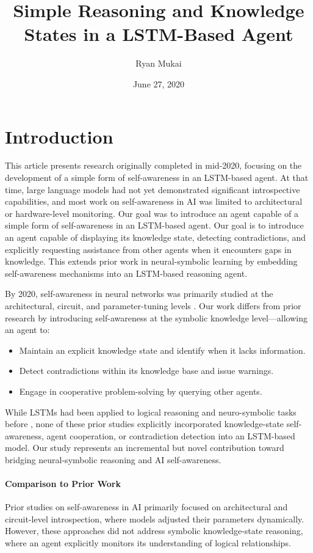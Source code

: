\documentclass{article}
\title{Simple Reasoning and Knowledge States in a LSTM-Based Agent}
\author{Ryan Mukai}
\date{June 27, 2020}
\begin{document}
\maketitle

\section{Introduction}

This article presents research originally completed in mid-2020, focusing on the development of a simple form of self-awareness in an LSTM-based agent. At that time, large language models had not yet demonstrated significant introspective capabilities, and most work on self-awareness in AI was limited to architectural or hardware-level monitoring. Our goal was to introduce an agent capable of a simple form of self-awareness in an LSTM-based agent. Our goal is to introduce an agent capable of displaying its knowledge state, detecting contradictions, and explicitly requesting assistance from other agents when it encounters gaps in knowledge. This extends prior work in neural-symbolic learning by embedding self-awareness mechanisms into an LSTM-based reasoning agent.

By 2020, self-awareness in neural networks was primarily studied at the architectural, circuit, and parameter-tuning levels \cite{9045930}. Our work differs from prior research by introducing self-awareness at the symbolic knowledge level—allowing an agent to:
\begin{itemize}
    \item Maintain an explicit knowledge state and identify when it lacks information.
    \item Detect contradictions within its knowledge base and issue warnings.
    \item Engage in cooperative problem-solving by querying other agents.
\end{itemize}

While LSTMs had been applied to logical reasoning and neuro-symbolic tasks before \cite{DBLP:journals/corr/abs-1711-03902, neural_symbolic_2007, DBLP:journals/corr/abs-1802-08535}, none of these prior studies explicitly incorporated knowledge-state self-awareness, agent cooperation, or contradiction detection into an LSTM-based model. Our study represents an incremental but novel contribution toward bridging neural-symbolic reasoning and AI self-awareness.

\paragraph{Comparison to Prior Work}
Prior studies on self-awareness in AI \cite{9045930} primarily focused on architectural and circuit-level introspection, where models adjusted their parameters dynamically. However, these approaches did not address symbolic knowledge-state reasoning, where an agent explicitly monitors its understanding of logical relationships.
\end{document}
